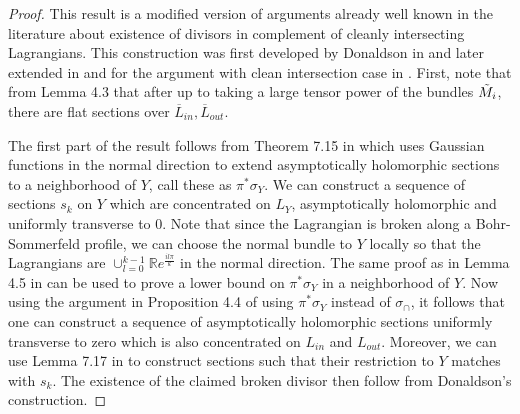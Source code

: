 \documentclass[11pt, oneside,dvipsnames]{amsart}
\newcommand{\<}{\langle}
\renewcommand{\>}{\rangle}
\newcommand{\inn}{{in}}
\newcommand{\out}{{out}}
\newcommand{\bR}{\mathbb{R}}
\theoremstyle{definition}
\theoremstyle{definition}
\numberwithin{equation}{subsection}
\begin{document}
\begin{proof}
This result is a modified version of arguments already well known in the literature about existence of divisors in complement of cleanly intersecting Lagrangians. This construction was first developed by Donaldson in \cite{donaldson:symplsub} and later extended in \cite{aurmohgay:symplchyp, floflip} and for the argument with clean intersection case in \cite{PT20}.
First, note that from Lemma 4.3 \cite{bcsw1} that after up to taking a large tensor power of the bundles $\Tilde{M}_i$, there are flat sections over $\overline{L}_\inn, \overline{L}_\out $.

The first part of the result follows from  Theorem 7.15 in \cite{floflip} which uses Gaussian functions in the normal direction to extend asymptotically holomorphic sections to a neighborhood of $Y$, call these as $\pi^* \sigma_Y$. We can construct a sequence of sections $s_k$ on $Y$ which are concentrated on $L_Y$, asymptotically holomorphic and uniformly transverse to 0. Note that since the Lagrangian is broken along a Bohr-Sommerfeld profile, we can choose the normal bundle to $Y$ locally so that the Lagrangians are $\cup_{l=0}^{k-1} \bR e^{\frac{il\pi}{k}}$ in the normal direction. The same proof as in Lemma 4.5 in \cite{bcsw1} can be used to prove a lower bound on $\pi^*\sigma_Y$ in a neighborhood of $Y$. Now using the argument in Proposition 4.4 of \cite{bcsw1} using $\pi^*\sigma_Y$ instead of $\sigma_\cap$, it follows that one can construct a sequence of asymptotically holomorphic sections uniformly transverse to zero which is also concentrated on $L_\inn$ and $L_\out$. Moreover, we can use Lemma 7.17 in \cite{floflip} to construct sections such that their restriction to $Y$ matches with $s_k$. The existence of the claimed broken divisor then follow from Donaldson's construction.
\end{proof}
\end{document}
